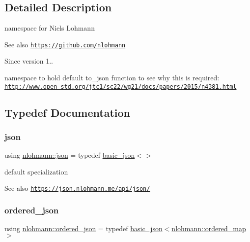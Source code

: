 \subsection{Detailed Description}
namespace for Niels Lohmann 

\begin{DoxySeeAlso}{See also}
\href{https://github.com/nlohmann}{\tt https\+://github.\+com/nlohmann} 
\end{DoxySeeAlso}
\begin{DoxySince}{Since}
version 1..
\end{DoxySince}
namespace to hold default {\ttfamily to\+\_\+json} function to see why this is required\+: \href{http://www.open-std.org/jtc1/sc22/wg21/docs/papers/2015/n4381.html}{\tt http\+://www.\+open-\/std.\+org/jtc1/sc22/wg21/docs/papers/2015/n4381.\+html} 

\subsection{Typedef Documentation}
\mbox{\label{namespacenlohmann_a2bfd99e845a2e5cd90aeaf1b1431f474}} 
\subsubsection{\texorpdfstring{json}{json}}
{\footnotesize\ttfamily using \hyperlink{namespacenlohmann_a2bfd99e845a2e5cd90aeaf1b1431f474}{nlohmann\+::json} = typedef \hyperlink{classnlohmann_1_1basic__json}{basic\+\_\+json}$<$$>$}



default specialization 

\begin{DoxySeeAlso}{See also}
\href{https://json.nlohmann.me/api/json/}{\tt https\+://json.\+nlohmann.\+me/api/json/} 
\end{DoxySeeAlso}
\mbox{\label{namespacenlohmann_ad53cef358adfa7f07cea23eb1e28b9ea}} 
\subsubsection{\texorpdfstring{ordered\+\_\+json}{ordered\_json}}
{\footnotesize\ttfamily using \hyperlink{namespacenlohmann_ad53cef358adfa7f07cea23eb1e28b9ea}{nlohmann\+::ordered\+\_\+json} = typedef \hyperlink{classnlohmann_1_1basic__json}{basic\+\_\+json}$<$\hyperlink{structnlohmann_1_1ordered__map}{nlohmann\+::ordered\+\_\+map}$>$}




